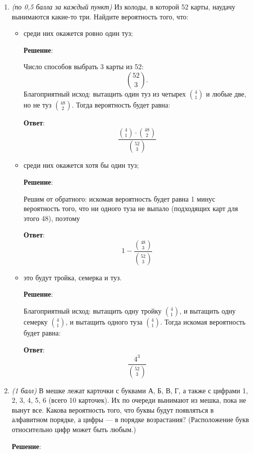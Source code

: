 \documentclass{article}
\begin{document}
  \begin{enumerate}
    \item \textit{(по 0,5 балла за каждый пункт)} Из колоды, в которой 52 карты, наудачу вынимаются какие-то три. Найдите вероятность того, что:
    \begin{itemize}
        \item среди них окажется ровно один туз;
        
        \textbf{Решение}:

        Число способов выбрать 3 карты из 52:
        \begin{equation}
            \binom{52}{3}.
        \end{equation}
        Благоприятный исход: вытащить один туз из четырех $\binom{4}{1}$ и любые две, но не туз $\binom{48}{2}$. Тогда вероятность будет равна:

        \textbf{Ответ}:
        $$\dfrac{\binom{4}{1} \cdot \binom{48}{2}}{\binom{52}{3}}$$

        \item среди них окажется хотя бы один туз;
        
        \textbf{Решение}:

        Решим от обратного: искомая вероятность будет равна 1 минус вероятность того, что ни одного туза не выпало (подходящих карт для этого 48), поэтому

        \textbf{Ответ}:
        $$1-\dfrac{\binom{48}{3}}{\binom{52}{3}}$$

        \item это будут тройка, семерка и туз.
        
        \textbf{Решение}:

        Благоприятный исход: вытащить одну тройку $\binom{4}{1}$, и вытащить одну семерку $\binom{4}{1}$, и вытащить одного туза $\binom{4}{1}$. Тогда искомая вероятность будет равна:

        \textbf{Ответ}:
        $$\dfrac{4^3}{\binom{52}{3}}$$

    \end{itemize}
    \item \textit{(1 балл)} В мешке лежат карточки с буквами А, Б, В, Г, а также с цифрами 1, 2,
    3, 4, 5, 6 (всего 10 карточек). Их по очереди вынимают из мешка, пока не вынут
    все. Какова вероятность того, что буквы будут появляться в алфавитном порядке,
    а цифры — в порядке возрастания? (Расположение букв относительно цифр может
    быть любым.)

    \textbf{Решение}:


\end{enumerate}
\end{document}
